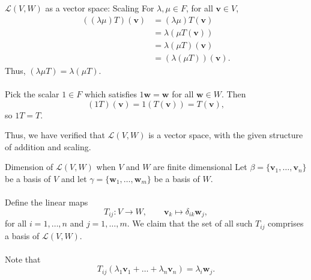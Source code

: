 \documentclass{beamer}
\def\v{\bm{v}}
\def\w{\bm{w}}
\def\L{\mathcal{L}}
\begin{document}
        \begin{frame}{$\L(V, W)$ as a vector space: Scaling}
                For $\lambda, \mu \in F$, for all $\v \in V$,
                \begin{align*}
                        ((\lambda \mu)T)(\v) &= (\lambda \mu) T(\v) \\
                                &= \lambda (\mu T(\v)) \\
                                &= \lambda (\mu T)(\v) \\
                                &= (\lambda (\mu T))(\v).
                \end{align*}
                Thus, $(\lambda \mu T) = \lambda (\mu T)$. \\~\\
                
                Pick the scalar $1 \in F$ which satisfies $1\w = \w$ for all $\w \in W$. Then
                \[
                        (1T)(\v) = 1(T(\v)) = T(\v),
                \]
                so $1T = T$.
        \end{frame}

        \begin{frame}
                Thus, we have verified that $\L(V, W)$ is a vector space, with the given structure of addition and scaling.
        \end{frame}

        \begin{frame}{Dimension of $\L(V, W)$ when $V$ and $W$ are finite dimensional}
                Let $\beta = \{\v_1, \dots, \v_n\}$ be a basis of $V$ and let $\gamma = \{\w_1, \dots, \w_m\}$ be a basis of $W$. \\~\\

                Define the linear maps
                \[
                        T_{ij}\colon V \to W, \qquad \v_k \mapsto \delta_{ik}\w_j,
                \]
                for all $i = 1, \dots, n$ and $j = 1, \dots, m$. We claim that the set of all such $T_{ij}$ comprises a basis of $\L(V, W)$. \\~\\
                \pause
                Note that 
                \[
                        T_{ij}(\lambda_1\v_1 + \dots + \lambda_n\v_n) = \lambda_i\w_j.
                \]
        \end{frame}
\end{document}
